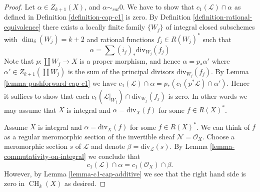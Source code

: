 \documentclass[10pt,a4paper]{amsart}
\theoremstyle{plain}
\theoremstyle{definition}
\theoremstyle{remark}
\numberwithin{equation}{subsection}
\def\CH{\mathop{\mathrm{CH}}\nolimits}
\begin{document}
\begin{proof}
Let $\alpha \in Z_{k + 1}(X)$, and $\alpha \sim_{rat} 0$.
We have to show that $c_1(\mathcal{L}) \cap \alpha$
as defined in Definition \ref{definition-cap-c1} is zero.
By Definition \ref{definition-rational-equivalence} there
exists a locally finite family $\{W_j\}$ of integral closed
subschemes with $\dim_\delta(W_j) = k + 2$ and rational functions
$f_j \in R(W_j)^*$ such that
$$
\alpha = \sum (i_j)_*\text{div}_{W_j}(f_j)
$$
Note that $p : \coprod W_j \to X$ is a proper morphism,
and hence $\alpha = p_*\alpha'$ where $\alpha' \in Z_{k + 1}(\coprod W_j)$
is the sum of the principal divisors $\text{div}_{W_j}(f_j)$.
By Lemma \ref{lemma-pushforward-cap-c1} we have
$c_1(\mathcal{L}) \cap \alpha = p_*(c_1(p^*\mathcal{L}) \cap \alpha')$.
Hence it suffices to show that each
$c_1(\mathcal{L}|_{W_j}) \cap \text{div}_{W_j}(f_j)$ is zero.
In other words we may assume that $X$ is integral and
$\alpha = \text{div}_X(f)$ for some $f \in R(X)^*$.

\medskip\noindent
Assume $X$ is integral and $\alpha = \text{div}_X(f)$ for some $f \in R(X)^*$.
We can think of $f$ as a regular meromorphic section of the invertible
sheaf $\mathcal{N} = \mathcal{O}_X$. Choose a meromorphic section
$s$ of $\mathcal{L}$ and denote $\beta = \text{div}_\mathcal{L}(s)$.
By Lemma \ref{lemma-commutativity-on-integral}
we conclude that
$$
c_1(\mathcal{L}) \cap \alpha = c_1(\mathcal{O}_X) \cap \beta.
$$
However, by Lemma \ref{lemma-c1-cap-additive} we see that the right hand side
is zero in $\CH_k(X)$ as desired.
\end{proof}
\end{document}
